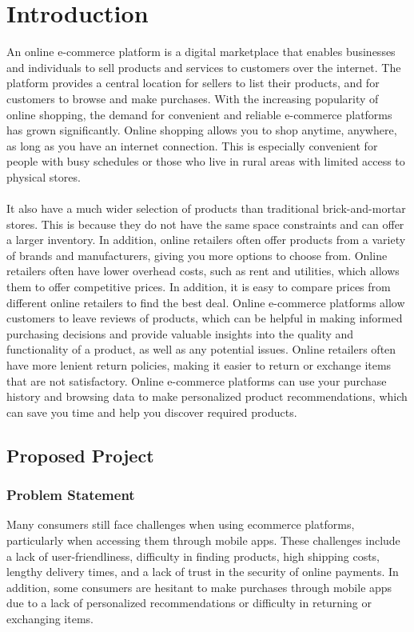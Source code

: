 \documentclass[11pt]{report}
\begin{document}
\chapter {Introduction}
\label{intro}
An online e-commerce platform is a digital marketplace that enables businesses and individuals to sell products and services to customers over the internet. The platform provides a central location for sellers to list their products, and for customers to browse and make purchases. With the increasing popularity of online shopping, the demand for convenient and reliable e-commerce platforms has grown significantly. Online shopping allows you to shop anytime, anywhere, as long as you have an internet connection. This is especially convenient for people with busy schedules or those who live in rural areas with limited access to physical stores.\\
\\It also have a much wider selection of products than traditional brick-and-mortar stores. This is because they do not have the same space constraints and can offer a larger inventory. In addition, online retailers often offer products from a variety of brands and manufacturers, giving you more options to choose from. Online retailers often have lower overhead costs, such as rent and utilities, which allows them to offer competitive prices. In addition, it is easy to compare prices from different online retailers to find the best deal. Online e-commerce platforms allow customers to leave reviews of products, which can be helpful in making informed purchasing decisions and provide valuable insights into the quality and functionality of a product, as well as any potential issues. Online retailers often have more lenient return policies, making it easier to return or exchange items that are not satisfactory.  Online e-commerce platforms can use your purchase history and browsing data to make personalized product recommendations, which can save you time and help you discover required products.


\section{Proposed Project}
\subsection{\label{ps}Problem Statement}
Many consumers still face challenges when using ecommerce platforms, particularly when accessing them through mobile apps. These challenges include a lack of user-friendliness, difficulty in finding products, high shipping costs, lengthy delivery times, and a lack of trust in the security of online payments. In addition, some consumers are hesitant to make purchases through mobile apps due to a lack of personalized recommendations or difficulty in returning or exchanging items.
\end{document}
